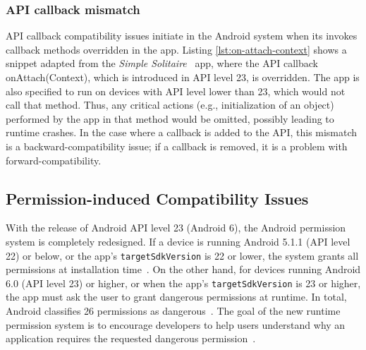 \begin{figure}%
    \lstset{language=Java}
     
\end{figure}


\subsubsection{API callback mismatch}

API callback compatibility issues initiate in the Android system when its invokes callback methods overridden in the app.  Listing \ref{lst:on-attach-context} shows a snippet adapted from the \emph{Simple Solitaire}~\cite{simplesolitaire} app, where the API callback \textsf{onAttach(Context)}, which is introduced in API level 23, is overridden. The app is also specified to run on devices with API level lower than 23, which would not call that method. Thus, any critical actions (e.g., initialization of
an object) performed by the app in that method would be omitted, possibly
leading to runtime crashes. In the case where a callback is added to the API, this mismatch is a backward-compatibility issue; if a callback is removed, it is a problem with forward-compatibility.

\subsection{Permission-induced Compatibility Issues} \label{sec-background:prm}

With the release of Android API level 23 (Android 6), the
Android permission system is completely redesigned.  If a
device is running Android 5.1.1 (API level 22) or below, or
the app's {\tt targetSdkVersion} is 22 or lower, the system
grants all permissions at installation
time~\cite{permissiongroups}. On the other hand, for devices
running Android 6.0 (API level 23) or higher, or when the
app's {\tt targetSdkVersion} is 23 or higher, the app must
ask the user to grant dangerous permissions at runtime.  In
total, Android classifies 26 permissions as
dangerous~\cite{dangerousAPI}.  The goal of the new runtime
permission system is to encourage developers to help users
understand why an application requires the requested
dangerous permission~\cite{runtimepermissions}. 

